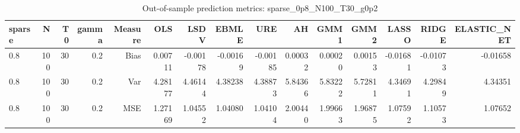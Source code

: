 \begin{table}[!htbp]\centering
\caption{Out-of-sample prediction metrics: sparse_0p8_N100_T30_g0p2}
\label{tab:table3_sparse_0p8_N100_T30_g0p2}
\begin{tabular}{lrrrrrrrrrrrrrr}
\hline
sparse & N & T0 & gamma & Measure & OLS & LSDV & EBMLE & URE & AH & GMM1 & GMM2 & LASSO & RIDGE & ELASTIC_NET \\
\hline
0.8 & 100 & 30 & 0.2 & Bias & 0.00711 & -0.00178 & -0.00169 & -0.00185 & 0.00032 & 0.00020 & 0.00153 & -0.01681 & -0.01073 & -0.01658 \\
0.8 & 100 & 30 & 0.2 & Var & 4.28177 & 4.46144 & 4.38238 & 4.38873 & 5.84366 & 5.83222 & 5.72811 & 4.34691 & 4.29849 & 4.34351 \\
0.8 & 100 & 30 & 0.2 & MSE & 1.27169 & 1.04552 & 1.04080 & 1.04104 & 2.00440 & 1.99663 & 1.96875 & 1.07592 & 1.10573 & 1.07652 \\
\hline
\end{tabular}
\end{table}


